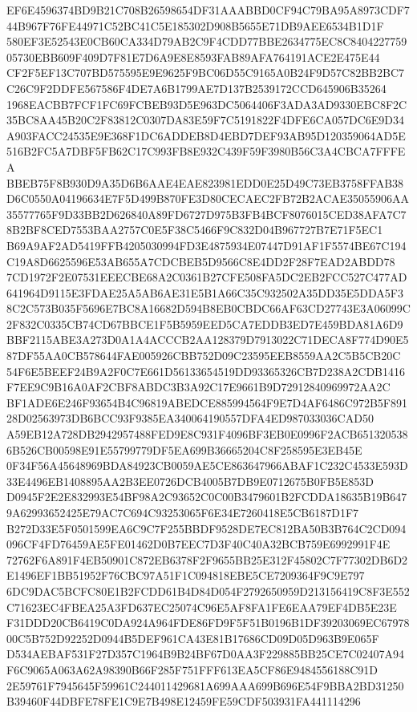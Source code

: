 \documentclass[UTF8,fontset=fandol,zihao=-4,a4paper]{ctexart}
\begin{document}
{{EF6E4596374BD9B21C708B26598654DF31AAABBD0CF94C79BA95A8973CDF744B967F76FE44971C52BC41C5E185302D908B5655E71DB9AEE6534B1D1F
580EF3E52543E0CB60CA334D79AB2C9F4CDD77BBE2634775EC8C840422775905730EBB609F409D7F81E7D6A9E8E8593FAB89AFA764191ACE2E475E44
CF2F5EF13C707BD575595E9E9625F9BC06D55C9165A0B24F9D57C82BB2BC7C26C9F2DDFE567586F4DE7A6B1799AE7D137B2539172CCD645906B35264
1968EACBB7FCF1FC69FCBEB93D5E963DC5064406F3ADA3AD9330EBC8F2C35BC8AA45B20C2F83812C0307DA83E59F7C5191822F4DFE6CA057DC6E9D34
A903FACC24535E9E368F1DC6ADDEB8D4EBD7DEF93AB95D120359064AD5E516B2FC5A7DBF5FB62C17C993FB8E932C439F59F3980B56C3A4CBCA7FFFEA
BBEB75F8B930D9A35D6B6AAE4EAE823981EDD0E25D49C73EB3758FFAB38D6C0550A04196634E7F5D499B870FE3D80CECAEC2FB72B2ACAE35055906AA
35577765F9D33BB2D626840A89FD6727D975B3FB4BCF8076015CED38AFA7C78B2BF8CED7553BAA2757C0E5F38C5466F9C832D04B967727B7E71F5EC1
B69A9AF2AD5419FFB4205030994FD3E4875934E07447D91AF1F5574BE67C194C19A8D6625596E53AB655A7CDCBEB5D9566C8E4DD2F28F7EAD2ABDD78
7CD1972F2E07531EEECBE68A2C0361B27CFE508FA5DC2EB2FCC527C477AD641964D9115E3FDAE25A5AB6AE31E5B1A66C35C932502A35DD35E5DDA5F3
8C2C573B035F5696E7BC8A16682D594B8EB0CBDC66AF63CD27743E3A06099C2F832C0335CB74CD67BBCE1F5B5959EED5CA7EDDB3ED7E459BDA81A6D9
BBF2115ABE3A273D0A1A4ACCCB2AA128379D7913022C71DECA8F774D90E587DF55AA0CB578644FAE005926CBB752D09C23595EEB8559AA2C5B5CB20C
54F6E5BEEF24B9A2F0C7E661D56133654519DD93365326CB7D238A2CDB1416F7EE9C9B16A0AF2CBF8ABDC3B3A92C17E9661B9D72912840969972AA2C
BF1ADE6E246F93654B4C96819ABEDCE885994564F9E7D4AF6486C972B5F89128D02563973DB6BCC93F9385EA340064190557DFA4ED987033036CAD50
A59EB12A728DB2942957488FED9E8C931F4096BF3EB0E0996F2ACB6513205386B526CB00598E91E55799779DF5EA699B36665204C8F258595E3EB45E
0F34F56A45648969BDA84923CB0059AE5CE863647966ABAF1C232C4533E593D33E4496EB1408895AA2B3EE0726DCB4005B7DB9E0712675B0FB5E853D
D0945F2E2E832993E54BF98A2C93652C0C00B3479601B2FCDDA18635B19B6479A62993652425E79AC7C694C93253065F6E34E7260418E5CB6187D1F7
B272D33E5F0501599EA6C9C7F255BBDF9528DE7EC812BA50B3B764C2CD094096CF4FD76459AE5FE01462D0B7EEC7D3F40C40A32BCB759E6992991F4E
72762F6A891F4EB50901C872EB6378F2F9655BB25E312F45802C7F77302DB6D2E1496EF1BB51952F76CBC97A51F1C094818EBE5CE7209364F9C9E797
6DC9DAC5BCFC80E1B2FCDD61B4D84D054F2792650959D213156419C8F3E552C71623EC4FBEA25A3FD637EC25074C96E5AF8FA1FE6EAA79EF4DB5E23E
F31DDD20CB6419C0DA924A964FDE86FD9F5F51B0196B1DF39203069EC6797800C5B752D92252D0944B5DEF961CA43E81B17686CD09D05D963B9E065F
D534AEBAF531F27D357C1964B9B24BF67D0AA3F229885BB25CE7C02407A94F6C9065A063A62A98390B66F285F751FFF613EA5CF86E9484556188C91D
2E59761F7945645F59961C244011429681A699AAA699B696E54F9BBA2BD31250B39460F44DBFE78FE1C9E7B498E12459FE59CDF503931FA441114296
}}
\end{document}
